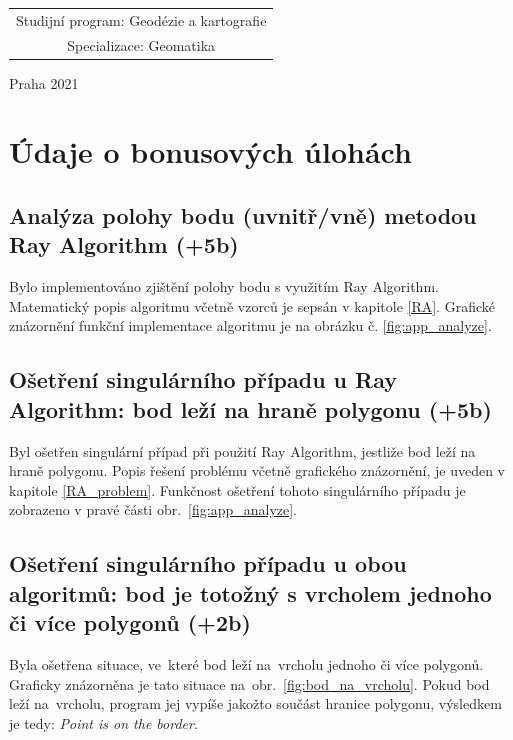 \documentclass[a4paper, 12pt, oneside, titlepage]{article} %
\begin{document}
\begin{center}
\begin{tabular}{c}
Studijní program: Geodézie a kartografie \\
\noalign{\vspace{2mm}}

Specializace: Geomatika\\

\end{tabular}


\vfill

Praha 2021

\end{center}



\clearpage
\section{Údaje o bonusových úlohách}
\subsection{Analýza polohy bodu (uvnitř/vně) metodou Ray Algorithm (+5b)}
Bylo implementováno zjištění polohy bodu s využitím Ray Algorithm. Matematický popis algoritmu včetně vzorců je sepsán v kapitole \ref{RA}. Grafické znázornění funkční implementace algoritmu je na obrázku č. \ref{fig:app_analyze}. 


\subsection{Ošetření singulárního případu u Ray Algorithm: bod leží na hraně polygonu (+5b)}
Byl ošetřen singulární případ při použití Ray Algorithm, jestliže bod leží na hraně polygonu. Popis řešení problému včetně grafického znázornění, je uveden v kapitole \ref{RA_problem}. Funkčnost ošetření tohoto singulárního případu je zobrazeno v pravé části obr.~\ref{fig:app_analyze}.


\subsection{Ošetření singulárního případu u obou algoritmů: bod je totožný s vrcholem jednoho či více polygonů (+2b)}
Byla ošetřena situace, ve~které bod leží na~vrcholu jednoho či více polygonů. Graficky znázorněna je tato situace na~obr.~\ref{fig:bod_na_vrcholu}. Pokud bod leží na~vrcholu, program jej vypíše jakožto součást hranice polygonu, výsledkem je tedy: \emph{Point is on the border}.
\end{document}
